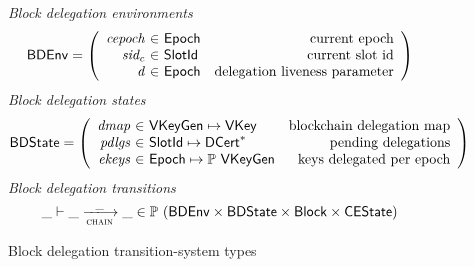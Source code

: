 \begin{figure}
  \emph{Block delegation environments}
  \begin{equation*}
    \BDEnv =
    \left(
      \begin{array}{r@{~\in~}lr}
        \var{cepoch} & \Epoch & \text{current epoch}\\
        \var{sid_c} & \SlotId & \text{current slot id}\\
        \var{d} & \Epoch & \text{delegation liveness parameter}\\
      \end{array}
    \right)
  \end{equation*}
  \emph{Block delegation states}
  \begin{equation*}
    \BDState =
    \left(
      \begin{array}{r@{~\in~}lr}
        \var{dmap} & \VKeyGen \mapsto \VKey & \text{blockchain delegation map}\\
        \var{pdlgs} & \SlotId \mapsto \seqof{\DCert} & \text{pending delegations}\\
        \var{ekeys} & \Epoch \mapsto \powerset{\VKeyGen} & \text{keys delegated per epoch}
      \end{array}
    \right)
  \end{equation*}
  \emph{Block delegation transitions}
  \begin{equation*}
    \_ \vdash \_ \trans{chain}{\_} \_ \in
      \powerset (\BDEnv \times \BDState \times \Block \times \CEState)
  \end{equation*}
  \caption{Block delegation transition-system types}
  \label{fig:block-delegation-ts-types}
\end{figure}


